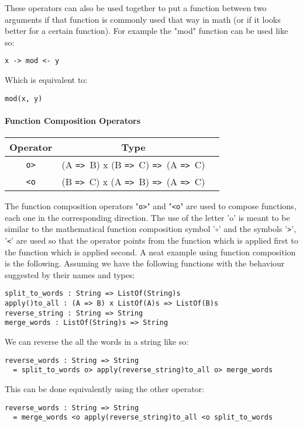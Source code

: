 \documentclass{article}
\def\ra{\texttt{=>}\ }
\begin{document}
These operators can also be used together to put a function between two arguments
if that function is commonly used that way in math (or if it looks better for a
certain function). For example the "mod" function can be used like so:
\begin{center}
\texttt{x -> mod <- y}
\end{center}
Which is equivalent to:
\begin{center}
\texttt{mod(x, y)}
\end{center}

\paragraph{Function Composition Operators}
\begin{center}
\begin{tabular}{ |c|c|c| } 
\hline
Operator & Type \\ 
\hline
\hline
\texttt{o>} & (A \ra B) x (B \ra C) \ra (A \ra C) \\
\hline
\texttt{<o} & (B \ra C) x (A \ra B) \ra (A \ra C) \\
\hline
\end{tabular}
\end{center}
The function composition operators "\texttt{o>}" and "\texttt{<o}" are used to 
compose functions, each one in the corresponding direction. The use of the letter 'o'
is meant to be similar to the mathematical function composition symbol '\(\circ\)'
and the symbols '\texttt{>}', '\texttt{<}' are used so that the operator points from
the function which is applied first to the function which is applied second.
A neat example using function composition is the following. Assuming we have the
following functions with the behaviour suggested by their names and types: 
\begin{verbatim}
split_to_words : String => ListOf(String)s
apply()to_all : (A => B) x ListOf(A)s => ListOf(B)s
reverse_string : String => String
merge_words : ListOf(String)s => String
\end{verbatim}
We can reverse the all the words in a string like so:
\begin{verbatim}
reverse_words : String => String
  = split_to_words o> apply(reverse_string)to_all o> merge_words
\end{verbatim}
This can be done equivalently using the other operator:
\begin{verbatim}
reverse_words : String => String
  = merge_words <o apply(reverse_string)to_all <o split_to_words
\end{verbatim}
\end{document}
